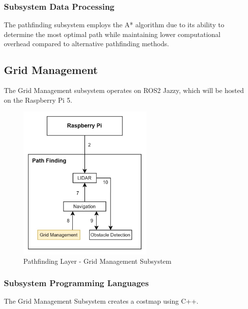 \subsubsection{Subsystem Data Processing}
The pathfinding subsystem employs the A* algorithm due to its ability to determine the most optimal path while maintaining lower computational overhead compared to alternative pathfinding methods.

\newpage

\subsection{Grid Management}
The Grid Management subsystem operates on ROS2 Jazzy, which will be hosted on the Raspberry Pi 5.

\begin{figure}[h!]
	\centering
 	\includegraphics[width=0.60\textwidth]{images/pathfinding/3_grid.jpg}
 \caption{Pathfinding Layer - Grid Management Subsystem}
\end{figure}


\subsubsection{Subsystem Programming Languages}
The Grid Management Subsystem creates a costmap using C++.

